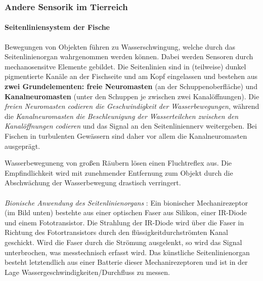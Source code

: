 \subsubsection{Andere Sensorik im Tierreich}

\paragraph{Seitenliniensystem der Fische \dangersign} Bewegungen von Objekten führen zu Wasserschwingung, welche durch das Seitenlinienorgan wahrgenommen werden können. Dabei werden Sensoren durch mechanosensitve Elemente gebildet. Die Seitenlinien sind in (teilweise) dunkel pigmentierte Kanäle an der Fischseite und am Kopf eingelassen und bestehen aus \textbf{zwei Grundelementen: freie Neuromasten} (an der Schuppenoberfläche) und \textbf{Kanalneuromasten} (unter den Schuppen je zwischen zwei Kanalöffnungen). Die \textit{freien Neuromasten codieren die Geschwindigkeit der Wasserbewegungen}, während die \textit{Kanalneuromasten die Beschleunigung der Wasserteilchen zwischen den Kanalöffnungen codieren} und das Signal an den Seitenliniennerv weitergeben. Bei Fischen in turbulenten Gewässern sind daher vor allem die Kanalneuromasten ausgeprägt.

Wasserbeweguneng von großen Räubern lösen einen Fluchtreflex aus. Die Empfindlichkeit wird mit zunehmender Entfernung zum Objekt durch die Abschwächung der Wasserbewegung drastisch verringert.
\\\\
\textit{Bionische Anwendung des Seitenlinienorgans} \dangersign: Ein bionischer Mechanirezeptor (im Bild unten) bestehte aus einer optischen Faser aus Silikon, einer IR-Diode und einem Fototransistor. Die Strahlung der IR-Diode wird über die Faser in Richtung des Fotortransistors durch den flüssigkeitdurchströmten Kanal geschickt. Wird die Faser durch die Strömung ausgelenkt, so wird das Signal unterbrochen, was messtechnisch erfasst wird. Das künstliche Seitenlinienorgan besteht letztendlich aus einer Batterie dieser Mechanirezeptoren und ist in der Lage Wassergeschwindigkeiten/Durchfluss zu messen.

